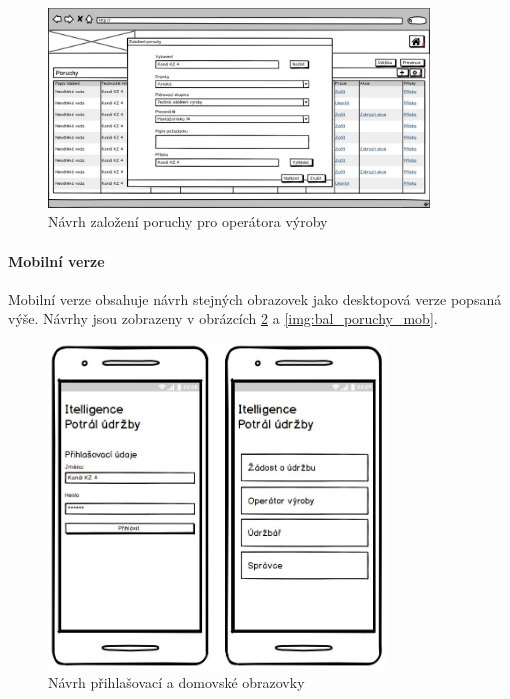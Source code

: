 \documentclass[thesis=M,czech]{FITthesis}[2012/06/26]
\begin{document}
\begin{figure}[H]
	\centering
	\includegraphics[width=0.9\textwidth]{images/bal_poruchy_seznam_zalozeni_poruchy}
	\caption{Návrh založení poruchy pro operátora výroby}
	\label{img:bal_poruchy_seznam_zalozeni_poruchy_desktop}
\end{figure}

\paragraph{Mobilní verze}
Mobilní verze obsahuje návrh stejných obrazovek jako desktopová verze popsaná výše. Návrhy jsou zobrazeny v obrázcích \ref{img:bal_login_hompage_mob} a \ref{img:bal_poruchy_mob}.

\begin{figure}[H]
	\centering
	\includegraphics[width=0.8\textwidth]{images/bal_login_hompage_mob}
	\caption{Návrh přihlašovací a domovské obrazovky}
	\label{img:bal_login_hompage_mob}
\end{figure}
\end{document}
